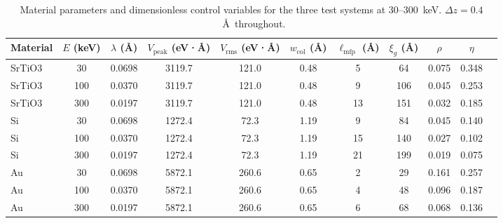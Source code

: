 \begin{table}[htbp]
  \caption{Material parameters and dimensionless control variables for the three test systems at 30--300~keV. $\Delta z=0.4$~\AA\ throughout.}
  \label{tab:material_params}
  \small
  \begin{tabular}{lcccccccccc}
    \toprule
    Material & $E$ (keV) & $\lambda$ (\AA) & $V_\text{peak}$ (eV·\AA) & $V_\text{rms}$ (eV·\AA) & $w_\text{col}$ (\AA) & $\ell_\text{mfp}$ (\AA) & $\xi_g$ (\AA) & $\rho$ & $\eta$ \\
    \midrule
    SrTiO3 & 30 & 0.0698 & 3119.7 & 121.0 & 0.48 & 5 & 64 & 0.075 & 0.348 \\
    SrTiO3 & 100 & 0.0370 & 3119.7 & 121.0 & 0.48 & 9 & 106 & 0.045 & 0.253 \\
    SrTiO3 & 300 & 0.0197 & 3119.7 & 121.0 & 0.48 & 13 & 151 & 0.032 & 0.185 \\
    Si & 30 & 0.0698 & 1272.4 & 72.3 & 1.19 & 9 & 84 & 0.045 & 0.140 \\
    Si & 100 & 0.0370 & 1272.4 & 72.3 & 1.19 & 15 & 140 & 0.027 & 0.102 \\
    Si & 300 & 0.0197 & 1272.4 & 72.3 & 1.19 & 21 & 199 & 0.019 & 0.075 \\
    Au & 30 & 0.0698 & 5872.1 & 260.6 & 0.65 & 2 & 29 & 0.161 & 0.257 \\
    Au & 100 & 0.0370 & 5872.1 & 260.6 & 0.65 & 4 & 48 & 0.096 & 0.187 \\
    Au & 300 & 0.0197 & 5872.1 & 260.6 & 0.65 & 6 & 68 & 0.068 & 0.136 \\
    \bottomrule
  \end{tabular}
\end{table}